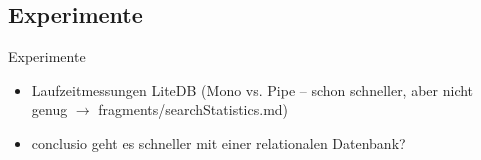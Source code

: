 \subsection{Experimente} \label{sec:Experimente}
    
    
    Experimente
    \begin{itemize}
        \item Laufzeitmessungen LiteDB (Mono vs. Pipe -- schon schneller, aber nicht genug $\rightarrow$ fragments/searchStatistics.md)
        \item conclusio geht es schneller mit einer relationalen Datenbank?
    \end{itemize}